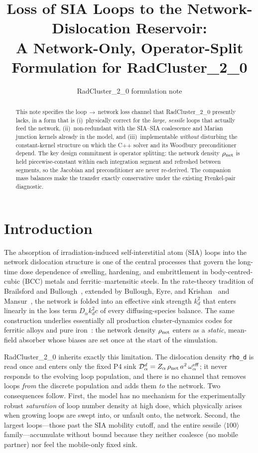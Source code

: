 \documentclass[11pt,a4paper]{article}
\title{Loss of SIA Loops to the Network-Dislocation Reservoir:\\
A Network-Only, Operator-Split Formulation for RadCluster\_2\_0}
\author{RadCluster\_2\_0 formulation note}
\date{}
\begin{document}
\maketitle

\begin{abstract}
\noindent
This note specifies the loop\,$\to$\,network loss channel that RadCluster\_2\_0
presently lacks, in a form that is (i)~physically correct for the
\emph{large, sessile} loops that actually feed the network, (ii)~non-redundant
with the SIA--SIA coalescence and Marian junction kernels already in the
model, and (iii)~implementable \emph{without} disturbing the constant-kernel
structure on which the C++ solver and its Woodbury preconditioner depend.
The key design commitment is operator splitting: the network density
$\rho_{\rm net}$ is held piecewise-constant within each integration segment
and refreshed between segments, so the Jacobian and preconditioner are never
re-derived.  The companion mass balances make the transfer exactly conservative
under the existing Frenkel-pair diagnostic.
\end{abstract}

\section{Introduction}

The absorption of irradiation-induced self-interstitial atom (SIA) loops
into the network dislocation structure is one of the central processes that
govern the long-time dose dependence of swelling, hardening, and
embrittlement in body-centred-cubic (BCC) metals and ferritic--martensitic
steels.  In the rate-theory tradition of Brailsford and
Bullough~\citep{Brailsford1972}, extended by Bullough, Eyre, and
Krishan~\citep{Bullough1975} and Mansur~\citep{Mansur1993}, the network is
folded into an effective sink strength $k_d^2$ that enters linearly in the
loss term $D_\alpha k_d^2 c$ of every diffusing-species balance.  The same
construction underlies essentially all production cluster-dynamics codes for
ferritic alloys and pure iron~\citep{GhoniemCho1979,HardouinDuparc2002,%
StollerGolubov2008,BarashevGolubov2009,KohnertWirth2018}: the network density
$\rho_{\rm net}$ enters as a \emph{static}, mean-field absorber whose biases
are set once at the start of the simulation.

RadCluster\_2\_0 inherits exactly this limitation.  The dislocation density
\texttt{rho\_d} is read once and enters only the fixed P4 sink
$\mathcal{D}_\alpha^d=Z_\alpha\,\rho_{\rm net}\,a^2\,\omega_\alpha^{\rm eff}$;
it never responds to the evolving loop population, and there is no channel
that removes loops \emph{from} the discrete population and adds them \emph{to}
the network.  Two consequences follow.  First, the model has no mechanism for
the experimentally robust \emph{saturation} of loop number density at high
dose, which physically arises when growing loops are swept into, or unfault
onto, the network.  Second, the largest loops---those past the SIA mobility
cutoff, and the entire sessile $\langle 100\rangle$ family---accumulate
without bound because they neither coalesce (no mobile partner) nor feel the
mobile-only fixed sink.
\end{document}
